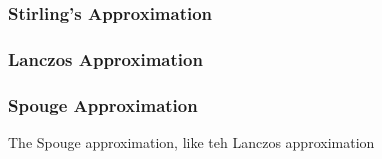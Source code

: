 \subsubsection{Stirling's Approximation}

\subsubsection{Lanczos Approximation}

\subsubsection{Spouge Approximation}
The Spouge approximation, like teh Lanczos approximation 

\clearpage
